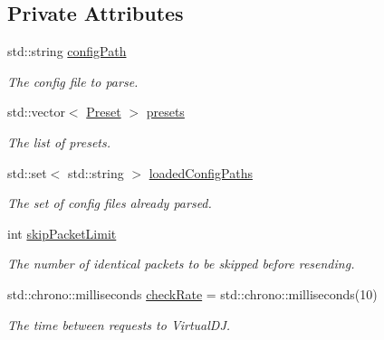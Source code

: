 \subsection*{Private Attributes}
\begin{DoxyCompactItemize}
\item 
\mbox{\label{classConfig_aa82482a705c93a00da195e3f9f974b23}} 
std\+::string \hyperlink{classConfig_aa82482a705c93a00da195e3f9f974b23}{config\+Path}
\begin{DoxyCompactList}\small\item\em The config file to parse. \end{DoxyCompactList}\item 
\mbox{\label{classConfig_a28f392a11a7cd755cd7493b25c8e89d0}} 
std\+::vector$<$ \hyperlink{structPreset}{Preset} $>$ \hyperlink{classConfig_a28f392a11a7cd755cd7493b25c8e89d0}{presets}
\begin{DoxyCompactList}\small\item\em The list of presets. \end{DoxyCompactList}\item 
std\+::set$<$ std\+::string $>$ \hyperlink{classConfig_a02be73634e4b7debd0551a360dac9503}{loaded\+Config\+Paths}
\begin{DoxyCompactList}\small\item\em The set of config files already parsed. \end{DoxyCompactList}\item 
\mbox{\label{classConfig_adb31288f02cd583f05a37faf787c480b}} 
int \hyperlink{classConfig_adb31288f02cd583f05a37faf787c480b}{skip\+Packet\+Limit}
\begin{DoxyCompactList}\small\item\em The number of identical packets to be skipped before resending. \end{DoxyCompactList}\item 
\mbox{\label{classConfig_a7c4280b4a4c2f24cd98518f5d9757d2e}} 
std\+::chrono\+::milliseconds \hyperlink{classConfig_a7c4280b4a4c2f24cd98518f5d9757d2e}{check\+Rate} = std\+::chrono\+::milliseconds(10)
\begin{DoxyCompactList}\small\item\em The time between requests to Virtual\+DJ. \end{DoxyCompactList}\end{DoxyCompactItemize}


